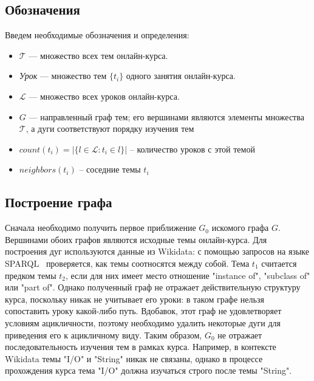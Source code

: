 \documentclass[14pt]{matmex-diploma-custom}
\begin{document}
\subsection{Обозначения}
Введем необходимые обозначения и определения:

\begin{itemize}
\item $\mathcal{T}$ --- множество всех тем онлайн-курса.
    \item \textit{Урок} --- множество тем $\{t_i\}$ одного занятия онлайн-курса.
    \item $\mathcal{L}$ --- множество всех уроков онлайн-курса.
    \item $G$ --- направленный граф тем; его вершинами являются элементы множества $\mathcal{T}$, а дуги соответствуют порядку изучения тем
    \item $count(t_i) = |\{l \in \mathcal{L} : t_i \in l \}|$ -- количество уроков с этой темой
    \item $neighbors(t_i)$ -- соседние темы $t_i$ \\ %
\end{itemize}

\subsection{Построение графа}

Сначала необходимо получить первое приближение $G_0$ искомого графа $G$. Вершинами обоих графов являются исходные темы онлайн-курса. Для построения дуг используются данные из Wikidata: с помощью запросов на языке SPARQL~\cite{SPARQL} проверяется, как темы соотносятся между собой. Тема $t_1$ считается предком темы $t_2$, если для них имеет место отношение "instance of", "subclass of" или "part of". Однако полученный граф не отражает действительную структуру курса, поскольку никак не учитывает его уроки: в таком графе нельзя сопоставить уроку какой-либо путь. Вдобавок, этот граф не удовлетворяет условиям ацикличности, поэтому необходимо удалить некоторые дуги для приведения его к ацикличному виду. Таким образом, $G_0$ не отражает последовательность изучения тем в рамках курса. Например, в контексте Wikidata темы "I/O" и "String" никак не связаны, однако в процессе прохождения курса тема "I/O" должна изучаться строго после темы "String".
\end{document}
